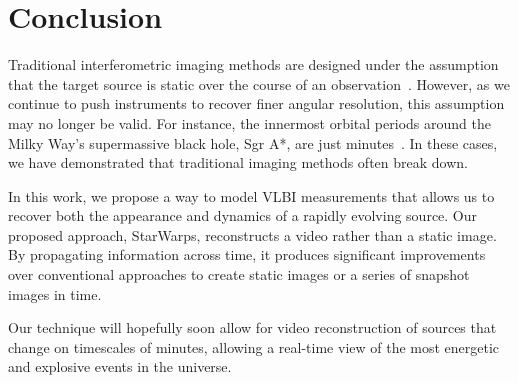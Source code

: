 %







\vspace{-.15in}
\section{Conclusion}
\label{sec:conclusion}

Traditional interferometric imaging methods are designed under the assumption that the target source is static over the course of an observation~\cite{TMS}. However, as we continue to push instruments to recover finer angular resolution, this assumption may no longer be valid. For instance, the innermost orbital periods around the Milky Way's supermassive black hole, Sgr A*, are just minutes~\cite{orbitalperiod}. In these cases, we have demonstrated that traditional imaging methods often break down. 

In this work, we propose a way to model VLBI measurements that allows us to recover both the appearance and dynamics of a rapidly evolving source. Our proposed approach, StarWarps, reconstructs a video rather than a static image. By propagating information across time, it produces significant improvements over conventional approaches to create static images or a series of snapshot images in time.

Our technique will hopefully soon allow for video reconstruction of sources that change on timescales of minutes, allowing a real-time view of the most energetic and explosive events in the universe. 

\vspace{-.2in}






 

